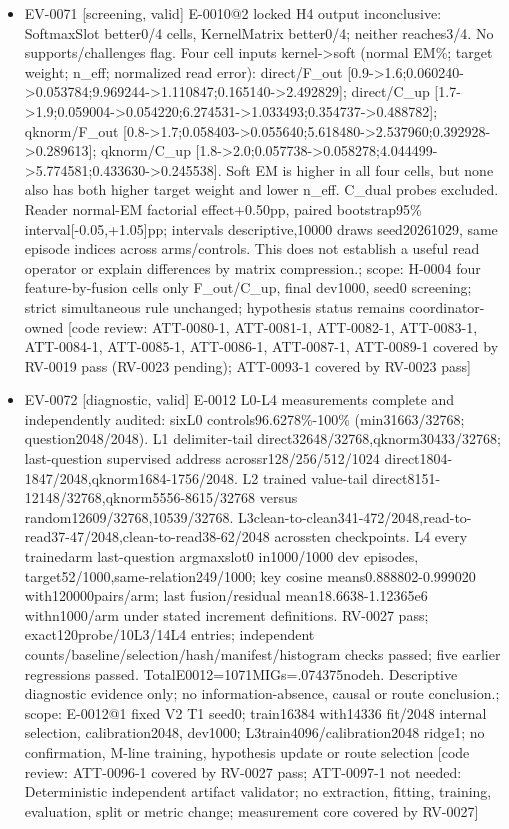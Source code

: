 \documentclass[11pt]{article}
\begin{document}
\begin{itemize}
\item EV-0071 [screening, valid] E-0010@2 locked H4 output inconclusive: SoftmaxSlot better0/4 cells, KernelMatrix better0/4; neither reaches3/4. No supports/challenges flag. Four cell inputs kernel-\textgreater{}soft (normal EM\%; target weight; n\_eff; normalized read error): direct/F\_out [0.9-\textgreater{}1.6;0.060240-\textgreater{}0.053784;9.969244-\textgreater{}1.110847;0.165140-\textgreater{}2.492829]; direct/C\_up [1.7-\textgreater{}1.9;0.059004-\textgreater{}0.054220;6.274531-\textgreater{}1.033493;0.354737-\textgreater{}0.488782]; qknorm/F\_out [0.8-\textgreater{}1.7;0.058403-\textgreater{}0.055640;5.618480-\textgreater{}2.537960;0.392928-\textgreater{}0.289613]; qknorm/C\_up [1.8-\textgreater{}2.0;0.057738-\textgreater{}0.058278;4.044499-\textgreater{}5.774581;0.433630-\textgreater{}0.245538]. Soft EM is higher in all four cells, but none also has both higher target weight and lower n\_eff. C\_dual probes excluded. Reader normal-EM factorial effect+0.50pp, paired bootstrap95\% interval[-0.05,+1.05]pp; intervals descriptive,10000 draws seed20261029, same episode indices across arms/controls. This does not establish a useful read operator or explain differences by matrix compression.; scope: H-0004 four feature-by-fusion cells only F\_out/C\_up, final dev1000, seed0 screening; strict simultaneous rule unchanged; hypothesis status remains coordinator-owned [code review: ATT-0080-1, ATT-0081-1, ATT-0082-1, ATT-0083-1, ATT-0084-1, ATT-0085-1, ATT-0086-1, ATT-0087-1, ATT-0089-1 covered by RV-0019 pass (RV-0023 pending); ATT-0093-1 covered by RV-0023 pass]
\item EV-0072 [diagnostic, valid] E-0012 L0-L4 measurements complete and independently audited: sixL0 controls96.6278\%-100\% (min31663/32768; question2048/2048). L1 delimiter-tail direct32648/32768,qknorm30433/32768; last-question supervised address acrossr128/256/512/1024 direct1804-1847/2048,qknorm1684-1756/2048. L2 trained value-tail direct8151-12148/32768,qknorm5556-8615/32768 versus random12609/32768,10539/32768. L3clean-to-clean341-472/2048,read-to-read37-47/2048,clean-to-read38-62/2048 acrossten checkpoints. L4 every trainedarm last-question argmaxslot0 in1000/1000 dev episodes, target52/1000,same-relation249/1000; key cosine means0.888802-0.999020 with120000pairs/arm; last fusion/residual mean18.6638-1.12365e6 withn1000/arm under stated increment definitions. RV-0027 pass; exact120probe/10L3/14L4 entries; independent counts/baseline/selection/hash/manifest/histogram checks passed; five earlier regressions passed. TotalE0012=1071MIGs=.074375nodeh. Descriptive diagnostic evidence only; no information-absence, causal or route conclusion.; scope: E-0012@1 fixed V2 T1 seed0; train16384 with14336 fit/2048 internal selection, calibration2048, dev1000; L3train4096/calibration2048 ridge1; no confirmation, M-line training, hypothesis update or route selection [code review: ATT-0096-1 covered by RV-0027 pass; ATT-0097-1 not needed: Deterministic independent artifact validator; no extraction, fitting, training, evaluation, split or metric change; measurement core covered by RV-0027]

\end{itemize}
\end{document}
